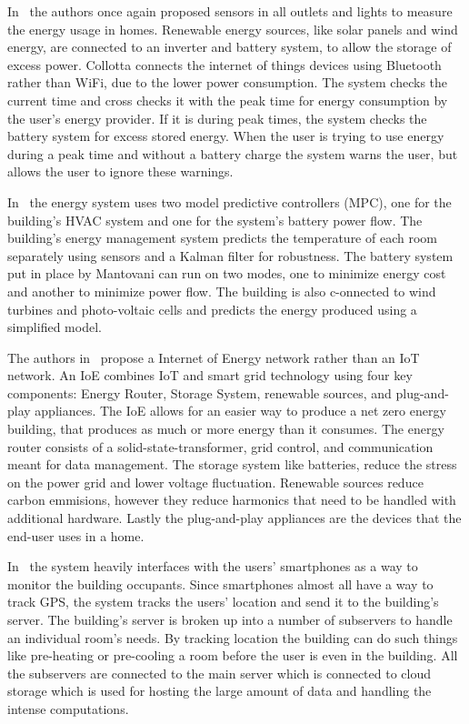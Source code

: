In~\cite{Collotta2015} the authors once again proposed sensors in all outlets and lights to measure the energy usage in homes. Renewable energy sources, like solar panels and wind energy, are connected to an inverter and battery system, to allow the storage of excess power. Collotta connects the internet of things devices using Bluetooth rather than WiFi, due to the lower power consumption. The system checks the current time and cross checks it with the peak time for energy consumption by the user's energy provider. If it is during peak times, the system checks the battery system for excess stored energy. When the user is trying to use energy during a peak time and without a battery charge the system warns the user, but allows the user to ignore these warnings.

In~\cite{Mantovani2014} the energy system uses two model predictive controllers (MPC), one for the building's HVAC system and one for the system's battery power flow. The building's energy management system predicts the temperature of each room separately using sensors and a Kalman filter for robustness. The battery system put in place by Mantovani can run on two modes, one to minimize energy cost and another to minimize power flow. The building is also c-onnected to wind turbines and photo-voltaic cells and predicts the energy produced using a simplified model.

The authors in~\cite{Hannan2018} propose a Internet of Energy network rather than an IoT network. An IoE combines IoT and smart grid technology using four key components: Energy Router, Storage System, renewable sources, and plug-and-play appliances. The IoE allows for an easier way to produce a net zero energy building, that produces as much or more energy than it consumes. The energy router consists of a solid-state-transformer, grid control, and communication meant for data management. The storage system like batteries, reduce the stress on the power grid and lower voltage fluctuation. Renewable sources reduce carbon emmisions, however they reduce harmonics that need to be handled with additional hardware. Lastly the plug-and-play appliances are the devices that the end-user uses in a home.

In~\cite{Pan2015} the system heavily interfaces with the users' smartphones as a way to monitor the building occupants. Since smartphones almost all have a way to track GPS, the system tracks the users' location and send it to the building's server. The building's server is broken up into a number of subservers to handle an individual room's needs. By tracking location the building can do such things like pre-heating or pre-cooling a room before the user is even in the building. All the subservers are connected to the main server which is connected to cloud storage which is used for hosting the large amount of data and handling the intense computations.



